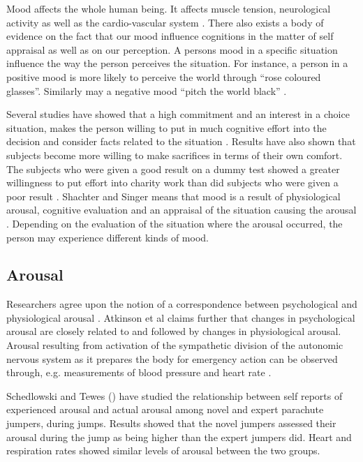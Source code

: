 Mood affects the whole human being.  It affects muscle tension,
neurological activity as well as the cardio-vascular system
\parencite{Izard77}.  There also exists a body of evidence on the fact
that our mood influence cognitions in the matter of self appraisal as
well as on our perception.  A persons mood in a specific situation
influence the way the person perceives the situation.  For instance, a
person in a positive mood is more likely to perceive the world through
``rose coloured glasses''.  Similarly may a negative mood ``pitch the
world black'' \parencite{Izard77}.

Several studies have showed that a high commitment and an interest in
a choice situation, makes the person willing to put in much cognitive
effort into the decision and consider facts related to the situation
\parencite{festinger64, Izard77, JanisMann77}.  Results have also
shown that subjects become more willing to make sacrifices in terms of
their own comfort.  The subjects who were given a good result on a
dummy test showed a greater willingness to put effort into charity
work than did subjects who were given a poor result \parencite{Weyant78}.
Shachter and Singer means that mood is a result of physiological
arousal, cognitive evaluation and an appraisal of the situation
causing the arousal \parencite{SchachterSinger62}.  Depending on the
evaluation of the situation where the arousal occurred, the person may
experience different kinds of mood.


\subsection{Arousal}

Researchers agree upon the notion of a correspondence between
psychological and physiological arousal \parencite{Atkinson93}.
Atkinson et al claims further that changes in
psychological arousal are closely related to and followed by changes
in physiological arousal.  Arousal resulting from activation of the
sympathetic division of the autonomic nervous system as it prepares
the body for emergency action can be observed through,
e.g. measurements of blood pressure and heart rate
\parencite{Atkinson93}.

Schedlowski and Tewes (\citeyear{SchedlowskiTewes92}) have studied the
relationship between self reports of experienced arousal and actual
arousal among novel and expert parachute jumpers, during jumps.
Results showed that the novel jumpers assessed their arousal during
the jump as being higher than the expert jumpers did.  Heart and
respiration rates showed similar levels of arousal between the two
groups.

